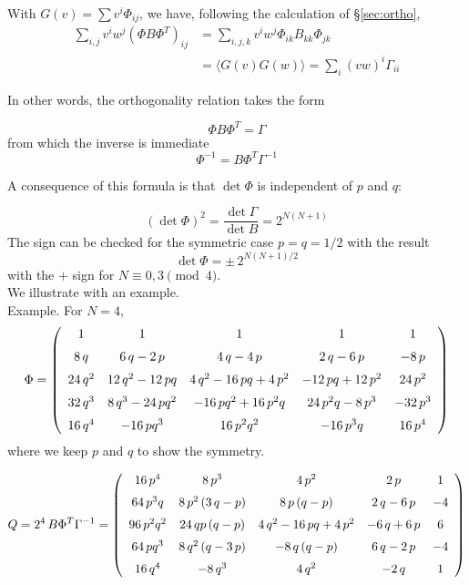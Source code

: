 \documentclass[runningheads]{llncs}
\def\avg#1.{\langle #1\rangle}
\begin{document}
With $G(v)=\sum v^i\Phi_{ij}$, we have, following the calculation of \S\ref{sec:ortho},
\begin{align*}
\sum_{i,j} v^iw^j(\Phi B\Phi^T)_{ij}&=\sum_{i,j,k}v^i w^j\Phi_{ik}B_{kk}\Phi_{jk}\\
&=\avg G(v)G(w).=\sum_i(vw)^i\Gamma_{ii}
\end{align*}

In other words, the orthogonality relation takes the form

$$\Phi B\Phi^T=\Gamma$$
from which the inverse is immediate
$$\Phi^{-1}=B\Phi^T\Gamma^{-1}$$

A consequence of this formula is that $\det \Phi$ is independent of $p$ and $q$:

$$(\det\Phi)^2=\frac{\det \Gamma}{\det B}=2^{N(N+1)}$$
The sign can be checked for the symmetric case $p=q=1/2$ with the result
$$\det \Phi=\pm\,2^{N(N+1)/2}$$
with the $+$ sign for $N\equiv 0,3 \pmod 4$.\\

We illustrate with an example.\\


Example. For $N=4$,
$$ \Phi= \left( \begin {array}{ccccc} 1&1&1&1&1\\\noalign{\medskip}8\,q&6\,q-2
\,p&4\,q-4\,p&2\,q-6\,p&-8\,p\\\noalign{\medskip}24\,{q}^{2}&12\,{q}^{
2}-12\,pq&4\,{q}^{2}-16\,pq+4\,{p}^{2}&-12\,pq+12\,{p}^{2}&24\,{p}^{2}
\\\noalign{\medskip}32\,{q}^{3}&8\,{q}^{3}-24\,p{q}^{2}&-16\,p{q}^{2}+
16\,{p}^{2}q&24\,{p}^{2}q-8\,{p}^{3}&-32\,{p}^{3}\\\noalign{\medskip}
16\,{q}^{4}&-16\,p{q}^{3}&16\,{p}^{2}{q}^{2}&-16\,{p}^{3}q&16\,{p}^{4}
\end {array} \right)$$
where we keep $p$ and $q$ to show the symmetry. 


$$Q=2^4\,B\Phi^T\Gamma^{-1}=\left( \begin {array}{ccccc} 16\,{p}^{4}&8\,{p}^{3}&4\,{p}^{2}&2\,p&1
\\\noalign{\medskip}64\,{p}^{3}q&8\,{p}^{2} \left( 3\,q-p \right) &8\,
p \left( q-p \right) &2\,q-6\,p&-4\\\noalign{\medskip}96\,{p}^{2}{q}^{
2}&24\,qp \left( q-p \right) &4\,{q}^{2}-16\,pq+4\,{p}^{2}&-6\,q+6\,p&
6\\\noalign{\medskip}64\,p{q}^{3}&8\,{q}^{2} \left( q-3\,p \right) &-8
\,q \left( q-p \right) &6\,q-2\,p&-4\\\noalign{\medskip}16\,{q}^{4}&-8
\,{q}^{3}&4\,{q}^{2}&-2\,q&1\end {array} \right)$$
\end{document}
